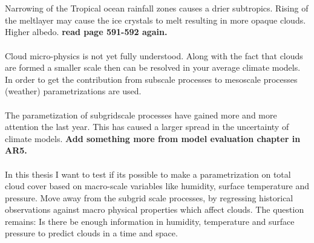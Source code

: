 \\ \\ 
Narrowing of the Tropical ocean rainfall zones causes a drier subtropics. Rising of the meltlayer may cause the ice crystals to melt resulting in more opaque clouds. Higher albedo. \textbf{read page 591-592 again.}
\\ \\
Cloud micro-physics is not yet fully understood. Along with the fact that clouds are formed a smaller scale then can be resolved in your average climate models. In order to get the contribution from subscale processes to mesoscale processes (weather) parametrizations are used. 
\\ \\
The parametization of subgridscale processes have gained more and more attention the last year. This has caused a larger spread in the uncertainty of climate models. \textbf{Add something more from model evaluation chapter in AR5.}
\\ \\ 
In this thesis I want to test if its possible to make a parametrization on total cloud cover based on macro-scale variables like humidity, surface temperature and pressure. Move away from the subgrid scale processes, by regressing historical observations against macro physical properties which affect clouds. The question remains: Is there be enough information in humidity, temperature and surface pressure to predict clouds in a time and space. 
